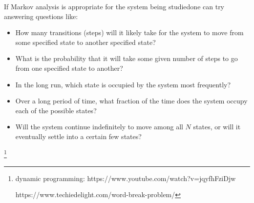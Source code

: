   If  Markov analysis is appropriate for the system being studiedone can try answering questions like:
\begin{itemize}
  \item How many transitions (steps) will it likely take for the system to move from some specified state to another specified state?
  \item What is the probability that it will take some given number of steps to go from one specified state to another?
  \item In the long run, which state is occupied by the system most frequently?
  \item Over a long period of time, what fraction of the time does the system occupy each of the possible states?
  \item Will the system continue indefinitely to move among all $N$ states, or will it eventually settle into a certain few states?
\end{itemize}

\footnote{dynamic programming: https://www.youtube.com/watch?v=jqyfhFziDjw

https://www.techiedelight.com/word-break-problem/
}
